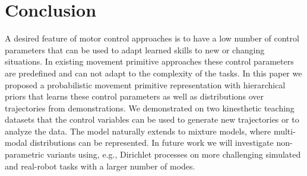 \section{Conclusion}
A desired feature of motor control approaches is to have a low number of 
control parameters that can be used to adapt learned skills to new or changing situations. 
In existing movement primitive approaches \cite{Paraschos2013,Ijspeert2003,Khansari-Zadeh2011} 
 these control parameters are predefined and can not adapt to the complexity of the tasks. 
In this paper we proposed a probabilistic movement primitive representation with hierarchical priors 
that learns these control parameters as well as distributions over trajectories 
from demonstrations. We demonstrated on two kinesthetic teaching datasets that 
the control variables can be used to generate new trajectories or to analyze the data. 
The model naturally extends to mixture models, where multi-modal distributions can be represented. 
In future work we will investigate non-parametric variants using, e.g., Dirichlet processes 
on more challenging simulated and real-robot tasks with a larger number of modes.

